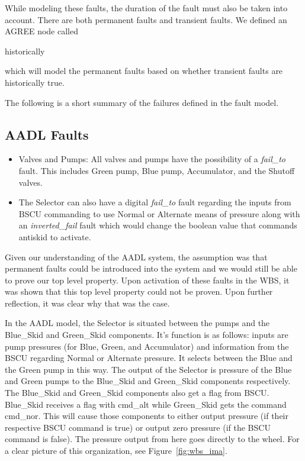 While modeling these faults, the duration of the fault must also be taken into account. There are both permanent faults and transient faults. We defined an AGREE node called 
\begin{tt}
historically
\end{tt}
which will model the permanent faults based on whether transient faults are historically true. 

The following is a short summary of the failures defined in the fault model. 

\subsection{AADL Faults}
\begin{itemize}

\item Valves and Pumps: All valves and pumps have the possibility of a \textit{fail\_to} fault. This includes Green pump, Blue pump, Accumulator, and the Shutoff valves. 

\item  The Selector can also have a digital \textit{fail\_to} fault regarding the inputs from BSCU commanding to use Normal or Alternate means of pressure along with an \textit{inverted\_fail} fault which would change the boolean value that commands antiskid to activate. 

\end{itemize}

Given our understanding of the AADL system, the assumption was that permanent faults could be introduced into the system and we would still be able to prove our top level property. Upon activation of these faults in the WBS, it was shown that this top level property could not be proven. Upon further reflection, it was clear why that was the case. 

In the AADL model, the Selector is situated between the pumps and the Blue\_Skid and Green\_Skid components. It's function is as follows: inputs are pump pressures (for Blue, Green, and Accumulator) and information from the BSCU regarding Normal or Alternate pressure. It selects between the Blue and the Green pump in this way. The output of the Selector is pressure of the Blue and Green pumps to the Blue\_Skid and Green\_Skid components respectively. The Blue\_Skid and Green\_Skid components also get a flag from BSCU. Blue\_Skid receives a flag with cmd\_alt while Green\_Skid gets the command cmd\_nor. This will cause those components to either output pressure (if their respective BSCU command is true) or output zero pressure (if the BSCU command is false). The pressure output from here goes directly to the wheel. For a clear picture of this organization, see Figure~\ref{fig:wbs_ima}.


